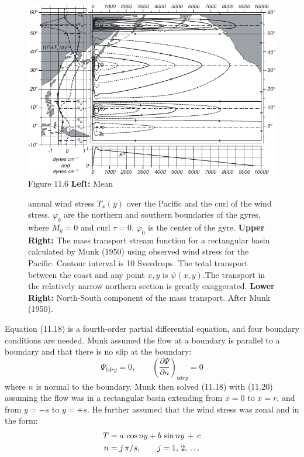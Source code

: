 \begin{figure}[t!]
\includegraphics{pics/munkcurrents}
\footnotesize
Figure 11.6 \textbf{Left:} Mean \rule{0mm}{4ex}annual wind
stress $T_x (y)$ over the Pacific
and the curl of the wind stress. $\varphi _b$ are the northern and
southern boundaries of the gyres, where $M_y = 0$ and curl $\tau = 0$.
$\varphi _0$ is the center of the gyre.  \textbf{Upper Right:} The
mass transport stream function for a
rectangular basin calculated by Munk (1950) using observed wind stress
for the Pacific. Contour interval is 10 Sverdrups. The total transport
between the coast and any point $x,y$ is $\psi (x,y)$.The transport in
the relatively narrow northern section is greatly exaggerated.
\textbf{Lower Right:} North-South component of the mass
transport. After Munk (1950).
\label{fig:munkcurrents}
\vspace{-3ex}
\end{figure}

Equation (11.18) is a fourth-order partial differential equation, and
four boundary conditions are needed. Munk assumed the flow at a
boundary is parallel to a boundary and that there is no slip at the
boundary:
\begin{equation}
\Psi_{bdry} = 0, \qquad \left(\frac{\partial{\Psi}}{\partial{n}}\right)_{bdry} = 0
\end{equation}
where $n$ is normal to the boundary. Munk then solved (11.18) with
(11.20) assuming the flow was in a rectangular basin extending from $x
= 0$ to $x = r$, and from $y = -s$ to $y = +s$. He further assumed
that the wind stress was zonal and in the form:
\begin{align}
T&=a\,\cos ny + b\,\sin ny \,+\, c  \notag \\
n&=j\,\pi/s, \qquad j=1,\,2,\,\dots
\end{align}

